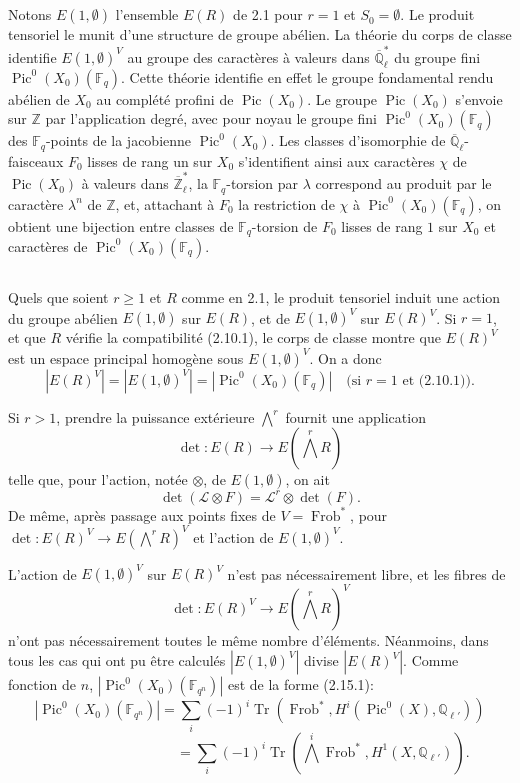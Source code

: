 \documentclass[11pt,a4paper]{article}
\theoremstyle{plain}
\theoremstyle{definition}
\DeclareMathOperator{\Pic}{Pic}
\DeclareMathOperator{\Frob}{Frob}
\DeclareMathOperator{\Tr}{Tr}
\newcommand{\Q}{\mathbb{Q}}
\newcommand{\Z}{\mathbb{Z}}
\newcommand{\F}{\mathbb{F}}
\newcommand{\Ql}{\overline{\mathbb{Q}}_\ell}
\newcommand{\Zl}{\overline{\mathbb{Z}}_\ell}
\begin{document}
\subsection{}
Notons $E(1, \emptyset)$ l'ensemble $E(R)$ de 2.1 pour $r = 1$ et $S_0 = \emptyset$. Le produit tensoriel le munit d'une structure de groupe ab\'elien. La th\'eorie du corps de classe identifie $E(1, \emptyset)^V$ au groupe des caract\`eres \`a valeurs dans $\Ql^*$ du groupe fini $\Pic^0(X_0)(\F_q)$. Cette th\'eorie identifie en effet le groupe fondamental rendu ab\'elien de $X_0$ au compl\'et\'e profini de $\Pic(X_0)$. Le groupe $\Pic(X_0)$ s'envoie sur $\Z$ par l'application degr\'e, avec pour noyau le groupe fini $\Pic^0(X_0)(\F_q)$ des $\F_q$-points de la jacobienne $\Pic^0(X_0)$. Les classes d'isomorphie de $\Ql$-faisceaux $F_0$ lisses de rang un sur $X_0$ s'identifient ainsi aux caract\`eres $\chi$ de $\Pic(X_0)$ \`a valeurs dans $\Zl^*$, la $\F_q$-torsion par $\lambda$ correspond au produit par le caract\`ere $\lambda^n$ de $\Z$, et, attachant \`a $F_0$ la restriction de $\chi$ \`a $\Pic^0(X_0)(\F_q)$, on obtient une bijection entre classes de $\F_q$-torsion de $F_0$ lisses de rang $1$ sur $X_0$ et caract\`eres de $\Pic^0(X_0)(\F_q)$.

\subsection{}
Quels que soient $r \geq 1$ et $R$ comme en 2.1, le produit tensoriel induit une action du groupe ab\'elien $E(1, \emptyset)$ sur $E(R)$, et de $E(1, \emptyset)^V$ sur $E(R)^V$. Si $r = 1$, et que $R$ v\'erifie la compatibilit\'e (2.10.1), le corps de classe montre que $E(R)^V$ est un espace principal homog\`ene sous $E(1, \emptyset)^V$. On a donc
\begin{equation}
|E(R)^V| = |E(1, \emptyset)^V| = |\Pic^0(X_0)(\F_q)| \quad \text{(si } r = 1 \text{ et (2.10.1))}.
\tag{6.2.1}
\end{equation}

Si $r > 1$, prendre la puissance ext\'erieure $\bigwedge^r$ fournit une application
\[
\det: E(R) \longrightarrow E(\textstyle\bigwedge^r R)
\]
telle que, pour l'action, not\'ee $\otimes$, de $E(1, \emptyset)$, on ait
\[
\det(\mathcal{L} \otimes F) = \mathcal{L}^r \otimes \det(F).
\]
De m\^eme, apr\`es passage aux points fixes de $V = \Frob^*$, pour $\det: E(R)^V \to E(\bigwedge^r R)^V$ et l'action de $E(1, \emptyset)^V$.

L'action de $E(1, \emptyset)^V$ sur $E(R)^V$ n'est pas n\'ecessairement libre, et les fibres de
\[
\det: E(R)^V \longrightarrow E(\textstyle\bigwedge^r R)^V
\]
n'ont pas n\'ecessairement toutes le m\^eme nombre d'\'el\'ements. N\'eanmoins, dans tous les cas qui ont pu \^etre calcul\'es $|E(1, \emptyset)^V|$ divise $|E(R)^V|$. Comme fonction de $n$, $|\Pic^0(X_0)(\F_{q^n})|$ est de la forme (2.15.1):
\[
|\Pic^0(X_0)(\F_{q^n})| = \sum_i (-1)^i \Tr(\Frob^*, H^i(\Pic^0(X), \Q_{\ell'}))
\]
\[
\phantom{|\Pic^0(X_0)(\F_{q^n})|} = \sum_i (-1)^i \Tr(\textstyle\bigwedge^i \Frob^*, H^1(X, \Q_{\ell'})).
\]
\end{document}

